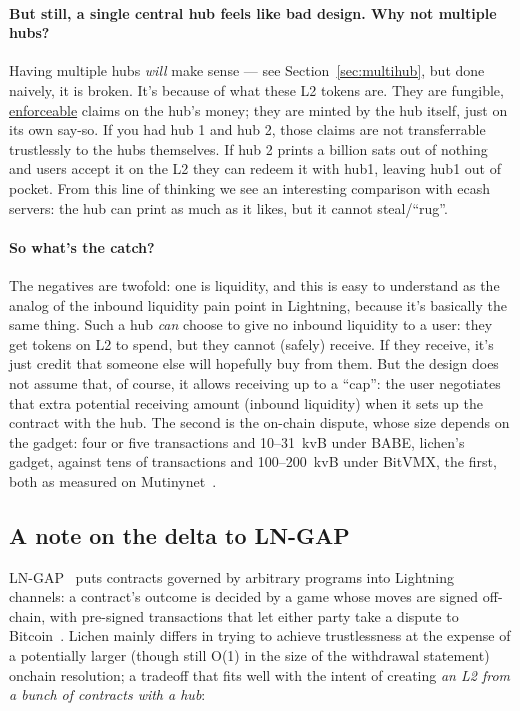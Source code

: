 \documentclass[11pt]{article}
\begin{document}
\paragraph{But still, a single central hub feels like bad design. Why not multiple hubs?} Having multiple hubs \emph{will} make sense --- see Section~\ref{sec:multihub}, but done naively, it is broken. It's because of what these L2 tokens are. They are fungible, \underline{enforceable} claims on the hub's money; they are minted by the hub itself, just on its own say-so. If you had hub 1 and hub 2, those claims are not transferrable trustlessly to the hubs themselves. If hub 2 prints a billion sats out of nothing and users accept it on the L2 they can redeem it with hub1, leaving hub1 out of pocket. From this line of thinking we see an interesting comparison with ecash servers: the hub can print as much as it likes, but it cannot steal/``rug''.

\paragraph{So what's the catch?} The negatives are twofold: one is liquidity, and this is easy to understand as the analog of the inbound liquidity pain point in Lightning, because it's basically the same thing. Such a hub \emph{can} choose to give no inbound liquidity to a user: they get tokens on L2 to spend, but they cannot (safely) receive. If they receive, it's just credit that someone else will hopefully buy from them. But the design does not assume that, of course, it allows receiving up to a ``cap'': the user negotiates that extra potential receiving amount (inbound liquidity) when it sets up the contract with the hub. The second is the on-chain dispute, whose size depends on the gadget: four or five transactions and 10--31~kvB under BABE, lichen's gadget, against tens of transactions and 100--200~kvB under BitVMX, the first, both as measured on Mutinynet~\cite{lichenbabe,lichenbitvmx}.

\subsection{A note on the delta to LN-GAP}
\label{sec:family}

LN-GAP~\cite{lngap} puts contracts governed by arbitrary programs into Lightning~\cite{lightning}
channels: a contract's outcome is decided by a game whose moves are
signed off-chain, with pre-signed transactions that let either party
take a dispute to Bitcoin~\cite{lngap}. Lichen mainly differs in trying to achieve trustlessness at the expense of a potentially larger (though still O(1) in the size of the withdrawal statement) onchain resolution; a tradeoff that fits well with the intent of creating \emph{an L2 from a bunch of contracts with a hub}:
\end{document}
